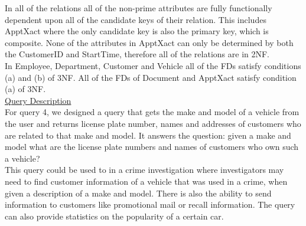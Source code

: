 \documentclass[12pt]{article}   %
\begin{document}
In all of the relations all of the non-prime attributes are fully functionally dependent upon all of the candidate keys of their relation. This includes ApptXact where the only candidate key is also the primary key, which is composite. None of the attributes in ApptXact can only be determined by both the CustomerID and StartTime, therefore all of the relations are in 2NF.\\

In Employee, Department, Customer and Vehicle all of the FDs satisfy conditions (a) and (b) of 3NF. All of the FDs of Document and ApptXact satisfy condition (a) of 3NF.\\
 
\underline{Query Description}\\
For query 4, we designed a query that gets the make and model of a vehicle from the user and returns license plate number, names and addresses of customers who are related to that make and model. It answers the question: given a make and model what are the license plate numbers and names of customers who own such a vehicle?\\
This query could be used to in a crime investigation where investigators may need to find customer information of a vehicle that was used in a crime, when given a description of a make and model. There is also the ability to send information to customers like promotional mail or recall information. The query can also provide statistics on the popularity of a certain car. 
\end{document}
